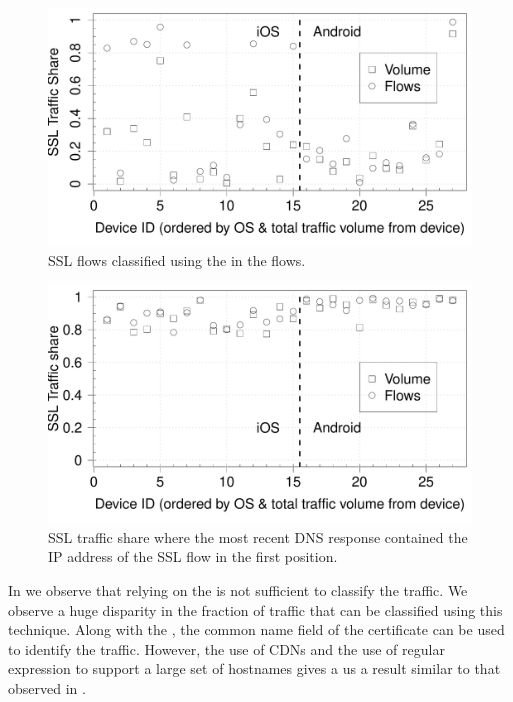 \begin{figure}[t]
\includegraphics[width=\columnwidth]{plots/sslanalysis_someservername_traffic.pdf}
\caption{SSL flows classified using the \sslservername in the flows.}
\label{fig:ssl-classification-servername}
\end{figure}
\begin{figure}[t]
\includegraphics[width=\columnwidth]{plots/sslanalysis_samedns_traffic.pdf}
\caption{SSL traffic share where the most recent DNS response contained the IP address of the SSL flow in the first position.}
\label{fig:ssl-classification-app-service}
\end{figure}


In  we observe that relying on
the \sslservername is not sufficient to classify the traffic.  We
observe a huge disparity in the fraction of traffic that can be
classified using this technique.  Along with the \sslservername, the
common name field of the certificate can be used to identify the
traffic.  However, the use of CDNs and the use of regular expression
to support a large set of hostnames gives a us a result similar to
that observed in .

